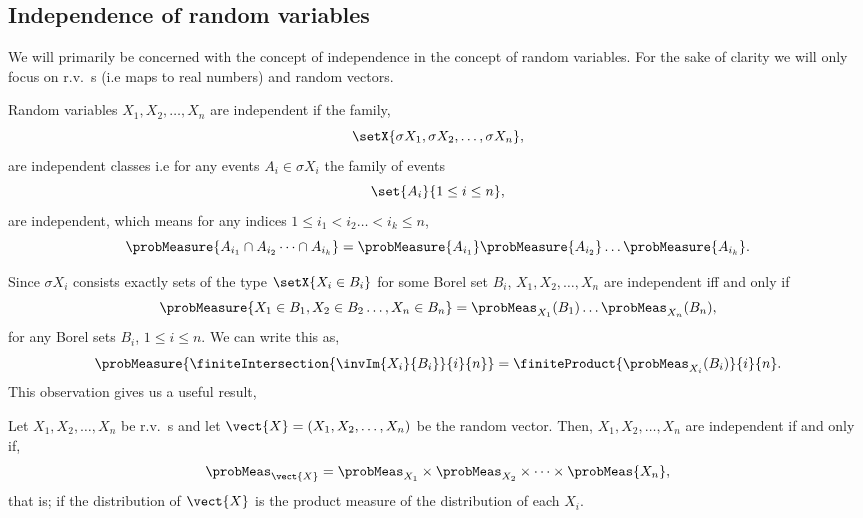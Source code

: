 \subsection{Independence of random variables}
We will primarily be concerned with the concept of independence in the concept of random variables. For the
sake of clarity we will only focus on r.v.~s (i.e maps to real numbers) and random vectors.
\begin{Definition}
    Random variables $X_1,X_2,\dots,X_n$ are independent if the family,
    \[\setX{\sigma{X_1},\sigma{X_2},\dots,\sigma{X_n}},\]
    are independent classes i.e for any events $A_i\in \sigma{X_i}$ the family of events
    \[\set{A_i}{1\leq i \leq n},\]
    are independent, which means for any indices $1\leq i_1 < i_2 \dots < i_k \leq n$,
    \[\probMeasure{A_{i_1}\cap A_{i_2}\dots \cap A_{i_k}} =
	\probMeasure{A_{i_1}}\probMeasure{A_{i_2}}\dots\probMeasure{A_{i_k}}.\] 
\end{Definition}
\begin{Remark}
    Since $\sigma{X_i}$ consists exactly sets of the type $\setX{X_i \in B_i}$ for some Borel set $B_i$,
    $X_1,X_2,\dots,X_n$ are independent iff and only if
    \[\probMeasure{X_1\in B_1,X_2\in B_2\dots, X_n\in B_n} =
	\probMeas_{X_1}(B_1)\dots\probMeas_{X_n}(B_n),\]
    for any Borel sets $B_i$, $1\leq i \leq n$.
    We can write this as,
    \[\probMeasure{\finiteIntersection{\invIm{X_i}{B_i}}{i}{n}} = \finiteProduct{\probMeas_{X_i}(B_i)}{i}{n}.\]
    This observation gives us a useful result,
\end{Remark}
\begin{Proposition}
    Let $X_1,X_2,\dots,X_n$ be r.v.~s and let $\vect{X} = (X_1,X_2,\dots,X_n)$ be the random vector. 
    Then, $X_1,X_2,\dots,X_n$ are independent if and only if,
    \[\probMeas_{\vect{X}} = \probMeas_{X_1}\times\probMeas_{X_2}\times\cdots\times\probMeas{X_n},\]
    that is; if the distribution of $\vect{X}$ is the product measure of the distribution of each $X_i$.
\end{Proposition}
